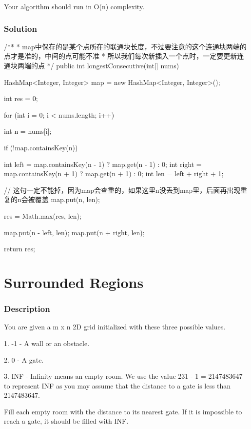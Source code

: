 Your algorithm should run in O(n) complexity.

\subsubsection{Solution}

\begin{Code}
/**
 * map中保存的是某个点所在的联通块长度，不过要注意的这个连通块两端的点才是准的，中间的点可能不准
 * 所以我们每次新插入一个点时，一定要更新连通块两端的点
 */
public int longestConsecutive(int[] nums) {
    HashMap<Integer, Integer> map = new HashMap<Integer, Integer>();

    int res = 0;

    for (int i = 0; i < nums.length; i++) {
        int n = nums[i];

        if (!map.containsKey(n)) {
            int left = map.containsKey(n - 1) ? map.get(n - 1) : 0;
            int right = map.containsKey(n + 1) ? map.get(n + 1) : 0;
            int len = left + right + 1;

            // 这句一定不能掉，因为map会查重的，如果这里n没丢到map里，后面再出现重复的n会被覆盖
            map.put(n, len);

            res = Math.max(res, len);

            map.put(n - left, len);
            map.put(n + right, len);
        }
    }

    return res;
}
\end{Code}

\newpage

\section{Surrounded Regions} %

\subsubsection{Description}

You are given a m x n 2D grid initialized with these three possible values.

1. -1 - A wall or an obstacle.

2. 0 - A gate.

3. INF - Infinity means an empty room. We use the value 231 - 1 = 2147483647 to represent INF as you may assume that the distance to a gate is less than 2147483647.

Fill each empty room with the distance to its nearest gate. If it is impossible to reach a gate, it should be filled with INF.

